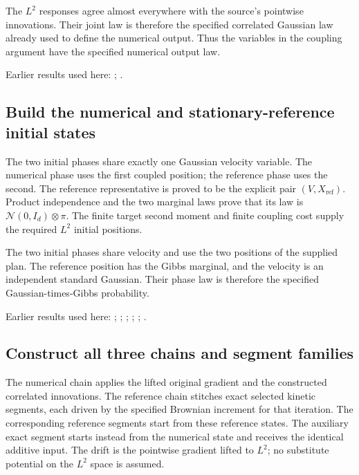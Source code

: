 \documentclass[11pt,a4paper]{report}
\begin{document}
The \(L^{2}\) responses agree almost everywhere with the source’s pointwise innovations. Their joint law is therefore the specified correlated Gaussian law already used to define the numerical output. Thus the variables in the coupling argument have the specified numerical output law.



Earlier results used here: \cite[Section~3.17.1]{LangevinLean2026ULASC}; \cite[Section~3.8.17]{LangevinLean2026ULASC}.
\subsection{\texorpdfstring{Build the numerical and stationary-reference initial states}{Build the numerical and stationary-reference initial states}}
\label{report-step-KineticLangevin-CanonicalCoupledSegments-lean-5}


The two initial phases share exactly one Gaussian velocity variable. The numerical phase uses the first coupled position; the reference phase uses the second. The reference representative is proved to be the explicit pair \((V,X_\mathrm{ref})\). Product independence and the two marginal laws prove that its law is \(\mathcal N(0,I_d)\otimes\pi\). The finite target second moment and finite coupling cost supply the required \(L^{2}\) initial positions.



The two initial phases share velocity and use the two positions of the supplied plan. The reference position has the Gibbs marginal, and the velocity is an independent standard Gaussian. Their phase law is therefore the specified Gaussian-times-Gibbs probability.



Earlier results used here: \cite[Section~3.17.1]{LangevinLean2026ULASC}; \cite[Section~3.17.2]{LangevinLean2026ULASC}; \cite[Section~3.22.17]{LangevinLean2026ULASC}; \cite[Section~3.22.19]{LangevinLean2026ULASC}; \cite[Section~3.22.20]{LangevinLean2026ULASC}; \cite[Section~3.22.6]{LangevinLean2026ULASC}.
\subsection{\texorpdfstring{Construct all three chains and segment families}{Construct all three chains and segment families}}
\label{report-step-KineticLangevin-CanonicalCoupledSegments-lean-6}


The numerical chain applies the lifted original gradient and the constructed correlated innovations. The reference chain stitches exact selected kinetic segments, each driven by the specified Brownian increment for that iteration. The corresponding reference segments start from these reference states. The auxiliary exact segment starts instead from the numerical state and receives the identical additive input. The drift is the pointwise gradient lifted to \(L^{2}\); no substitute potential on the \(L^{2}\) space is assumed.
\end{document}
